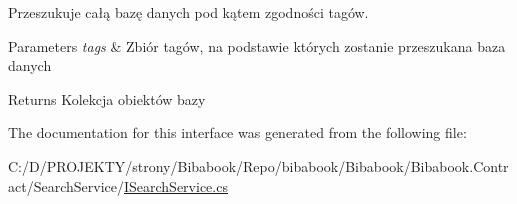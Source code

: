 Przeszukuje całą bazę danych pod kątem zgodności tagów. 


\begin{DoxyParams}{Parameters}
{\em tags} & Zbiór tagów, na podstawie których zostanie przeszukana baza danych\\
\hline
\end{DoxyParams}
\begin{DoxyReturn}{Returns}
Kolekcja obiektów bazy
\end{DoxyReturn}


The documentation for this interface was generated from the following file\+:\begin{DoxyCompactItemize}
\item 
C\+:/\+D/\+P\+R\+O\+J\+E\+K\+T\+Y/strony/\+Bibabook/\+Repo/bibabook/\+Bibabook/\+Bibabook.\+Contract/\+Search\+Service/\hyperlink{_i_search_service_8cs}{I\+Search\+Service.\+cs}\end{DoxyCompactItemize}
